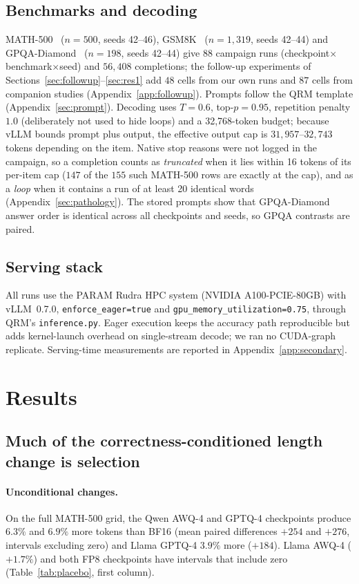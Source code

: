 \documentclass[11pt,a4paper]{article}
\begin{document}
\subsection{Benchmarks and decoding}
MATH-500~\cite{hendrycks2021math,lightman2023lets} ($n=500$, seeds 42--46), GSM8K~\cite{cobbe2021gsm8k} ($n=1{,}319$, seeds 42--44) and GPQA-Diamond~\cite{rein2023gpqa} ($n=198$, seeds 42--44) give 88 campaign runs (checkpoint$\times$benchmark$\times$seed) and $56{,}408$ completions; the follow-up experiments of Sections~\ref{sec:followup}--\ref{sec:res1} add $48$ cells from our own runs and $87$ cells from companion studies (Appendix~\ref{app:followup}). Prompts follow the QRM template (Appendix~\ref{sec:prompt}). Decoding uses $T=0.6$, top-$p=0.95$, repetition penalty $1.0$ (deliberately not used to hide loops) and a 32{,}768-token budget; because vLLM bounds prompt plus output, the effective output cap is $31{,}957$--$32{,}743$ tokens depending on the item. Native stop reasons were not logged in the campaign, so a completion counts as \emph{truncated} when it lies within 16 tokens of its per-item cap ($147$ of the $155$ such MATH-500 rows are exactly at the cap), and as a \emph{loop} when it contains a run of at least 20 identical words (Appendix~\ref{sec:pathology}). The stored prompts show that GPQA-Diamond answer order is identical across all checkpoints and seeds, so GPQA contrasts are paired.

\subsection{Serving stack}
All runs use the PARAM Rudra HPC system (NVIDIA A100-PCIE-80GB) with vLLM~0.7.0, \texttt{enforce\_eager=true} and \texttt{gpu\_memory\_utilization=0.75}, through QRM's \texttt{inference.py}. Eager execution keeps the accuracy path reproducible but adds kernel-launch overhead on single-stream decode; we ran no CUDA-graph replicate. Serving-time measurements are reported in Appendix~\ref{app:secondary}.

\section{Results}
\label{sec:results}
\subsection{Much of the correctness-conditioned length change is selection}
\label{sec:length}
\paragraph{Unconditional changes.} On the full MATH-500 grid, the Qwen AWQ-4 and GPTQ-4 checkpoints produce $6.3\%$ and $6.9\%$ more tokens than BF16 (mean paired differences $+254$ and $+276$, intervals excluding zero) and Llama GPTQ-4 $3.9\%$ more ($+184$). Llama AWQ-4 ($+1.7\%$) and both FP8 checkpoints have intervals that include zero (Table~\ref{tab:placebo}, first column).
\end{document}
